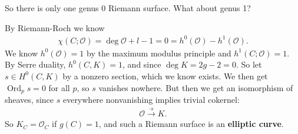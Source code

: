\begin{remark}

So there is only one genus 0 Riemann surface. What about genus 1?

\begin{figure}
\centering
{}
\end{figure}

By Riemann-Roch we know
\begin{align*}
\chi(C; {\mathcal{O}}) = \deg {\mathcal{O}}+ l - 1 = 0 = h^0({\mathcal{O}}) - h^1({\mathcal{O}})
.\end{align*}
We know \(h^0({\mathcal{O}}) = 1\) by the maximum modulus principle and
\(h^1(C; {\mathcal{O}}) = 1\). By Serre duality, \(h^0(C, K) = 1\), and
since \(\deg K = 2g-2 = 0\). So let \(s\in H^0(C, K)\) by a nonzero
section, which we know exists. We then get
\({\operatorname{Ord}}_p s = 0\) for all \(p\), so \(s\) vanishes
nowhere. But then we get an isomorphism of sheaves, since \(s\)
everywhere nonvanishing implies trivial cokernel:
\begin{align*}
{\mathcal{O}}\xrightarrow{\cdot s} K
.\end{align*}
So \(K_C = {\mathcal{O}}_C\) if \(g(C) = 1\), and such a Riemann surface
is an \textbf{elliptic curve}.

\end{remark}

